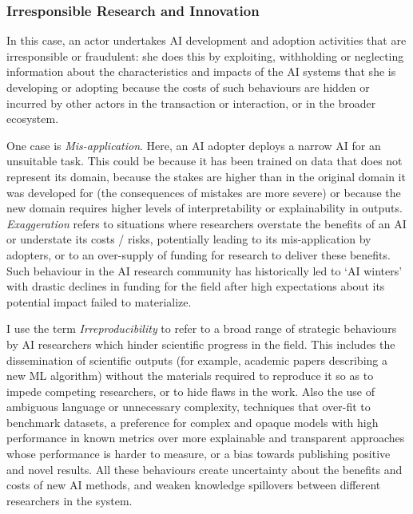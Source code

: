 \documentclass[11pt]{article}
\begin{document}
\subsubsection*{Irresponsible Research and Innovation}
In this case, an actor undertakes AI development and adoption activities that are irresponsible or fraudulent: she does this by exploiting, withholding or neglecting information about the characteristics and impacts of the AI systems that she is developing or adopting because the costs of such behaviours are hidden or incurred by other actors in the transaction or interaction, or in the broader ecosystem. 

One case is \textit{Mis-application}. Here, an AI adopter deploys a narrow AI for an unsuitable task. This could be because it has been trained on data that does not represent its domain, because the stakes are higher than in the original domain it was developed for (the consequences of mistakes are more severe) or because the new domain requires higher levels of interpretability or explainability in outputs. \textit{Exaggeration} refers to situations where researchers overstate the benefits of an AI or understate its costs / risks, potentially leading to its mis-application by adopters, or to an over-supply of funding for research to deliver these benefits. Such behaviour in the AI research community has historically led to `AI winters' with drastic declines in funding for the field after high expectations about its potential impact failed to materialize.

I use the term \textit{Irreproducibility} to refer to a broad range of strategic behaviours by AI researchers which hinder scientific progress in the field. This includes the dissemination of scientific outputs (for example, academic papers describing a new ML algorithm) without the materials required to reproduce it so as to impede competing researchers, or to hide flaws in the work. Also the use of ambiguous language or unnecessary complexity, techniques that over-fit to benchmark datasets, a preference for complex and opaque models with high performance in known metrics over more explainable and transparent approaches whose performance is harder to measure, or a bias towards publishing positive and novel results. All these behaviours create uncertainty about the benefits and costs of new AI methods, and weaken knowledge spillovers between different researchers in the system.
\end{document}
